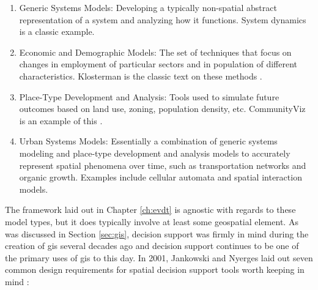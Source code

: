 \begin{enumerate}[itemsep=0pt,parsep=0pt]
	\item{Generic Systems Models: Developing a typically non-spatial abstract representation of a system and analyzing how it functions. System dynamics is a classic example.}
	\item{Economic and Demographic Models: The set of techniques that focus on changes in employment of particular sectors and in population of different characteristics. Klosterman is the classic text on these methods \cite{klostermanCommunityAnalysisPlanning1990}}.
	\item{Place-Type Development and Analysis: Tools used to simulate future outcomes based on land use, zoning, population density, etc. CommunityViz is an example of this \cite{walkerPlannersGuideCommunityViz2017}.}
	\item{Urban Systems Models: Essentially a combination of generic systems modeling and place-type development and analysis models to accurately represent spatial phenomena over time, such as transportation networks and organic growth. Examples include cellular automata and spatial interaction models.}
\end{enumerate}

The framework laid out in Chapter \ref{ch:evdt} is agnostic with regards to these model types, but it does typically involve at least some geospatial element. As was discussed in Section \ref{sec:gis}, decision support was firmly in mind during the creation of \ac{gis} several decades ago and decision support continues to be one of the primary uses of \ac{gis} to this day. In 2001, Jankowski and Nyerges laid out seven common design requirements for spatial decision support tools worth keeping in mind \cite{jankowskiGISGroupDecision2001}:

